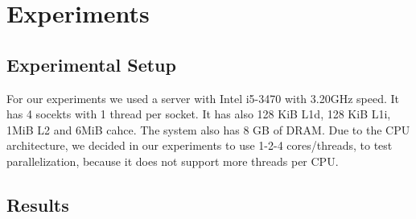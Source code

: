 \section{Experiments}
\label{sec:experiments}

\subsection{Experimental Setup}
For our experiments we used a server with Intel i5-3470 with 3.20GHz speed. It has 4 socekts with 1 thread per socket. It has also 128 KiB L1d, 128 KiB L1i, 1MiB L2 and 6MiB cahce. The system also has 8 GB of DRAM. Due to the CPU architecture, we decided in our experiments to use 1-2-4 cores/threads, to test parallelization, because it does not support more threads per CPU.


\subsection{Results}





